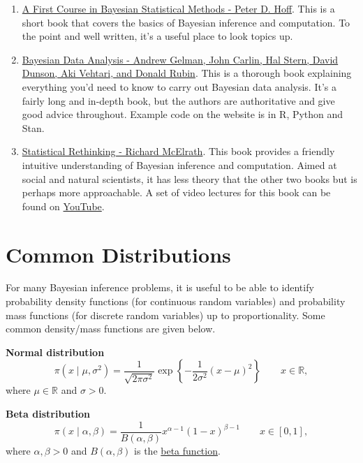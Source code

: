 \documentclass[
]{book}
\theoremstyle{definition}
\theoremstyle{definition}
\theoremstyle{definition}
\theoremstyle{definition}
\theoremstyle{remark}
\begin{document}
\begin{enumerate}
\def\labelenumi{\arabic{enumi}.}
\item
  \href{https://link.springer.com/book/10.1007/978-0-387-92407-6}{A First Course in Bayesian Statistical Methods - Peter D.
  Hoff}.
  This is a short book that covers the basics of Bayesian inference
  and computation. To the point and well written, it's a useful place
  to look topics up.
\item
  \href{http://www.stat.columbia.edu/~gelman/book/}{Bayesian Data Analysis - Andrew Gelman, John Carlin, Hal Stern,
  David Dunson, Aki Vehtari, and Donald
  Rubin}. This is a
  thorough book explaining everything you'd need to know to carry out
  Bayesian data analysis. It's a fairly long and in-depth book, but
  the authors are authoritative and give good advice throughout.
  Example code on the website is in R, Python and Stan.
\item
  \href{https://xcelab.net/rm/statistical-rethinking/}{Statistical Rethinking - Richard
  McElrath}. This book
  provides a friendly intuitive understanding of Bayesian inference
  and computation. Aimed at social and natural scientists, it has less
  theory that the other two books but is perhaps more approachable. A
  set of video lectures for this book can be found on
  \href{https://www.youtube.com/playlist?list=PLDcUM9US4XdMROZ57-OIRtIK0aOynbgZN}{YouTube}.
\end{enumerate}

\hypertarget{common-distributions}{%
\section{Common Distributions}\label{common-distributions}}

For many Bayesian inference problems, it is useful to be able to
identify probability density functions (for continuous random variables)
and probability mass functions (for discrete random variables) up to
proportionality. Some common density/mass functions are given below.

\textbf{Normal distribution} \[
\pi(x \mid \mu, \sigma^2) = \frac{1}{\sqrt{2\pi\sigma^2}}\exp\left\{-\frac{1}{2\sigma^2}(x-\mu)^2\right\} \qquad x \in\mathbb{R},
\] where \(\mu \in \mathbb{R}\) and \(\sigma > 0\).

\textbf{Beta distribution} \[
\pi(x\mid \alpha, \beta) = \frac{1}{B(\alpha, \beta)}x^{\alpha-1}(1-x)^{\beta - 1} \qquad  x \in [0, 1],
\] where \(\alpha, \beta > 0\) and \(B(\alpha, \beta)\) is the \href{https://en.wikipedia.org/wiki/Beta_function}{beta
function}.
\end{document}
